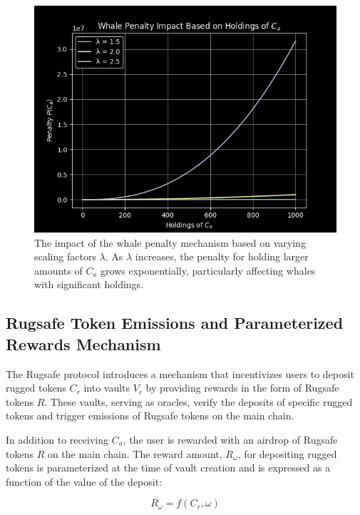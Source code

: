 \documentclass{article}
\begin{document}
\begin{figure}[h]
\centering
\includegraphics[width=\textwidth]{images/6.png}
\caption{The impact of the whale penalty mechanism based on varying scaling factors $\lambda$. As $\lambda$ increases, the penalty for holding larger amounts of $C_a$ grows exponentially, particularly affecting whales with significant holdings.}
\label{fig:whale_penalty}
\end{figure}









\subsection{Rugsafe Token Emissions and Parameterized Rewards Mechanism}

The Rugsafe protocol introduces a mechanism that incentivizes users to deposit rugged tokens $C_r$ into vaults $V_c$ by providing rewards in the form of Rugsafe tokens $R$. These vaults, serving as oracles, verify the deposits of specific rugged tokens and trigger emissions of Rugsafe tokens on the main chain.

In addition to receiving $C_a$, the user is rewarded with an airdrop of Rugsafe tokens $R$ on the main chain. The reward amount, $R_{\omega}$, for depositing rugged tokens is parameterized at the time of vault creation and is expressed as a function of the value of the deposit:

\[
R_{\omega} = f(C_r, \omega)
\]
\end{document}
